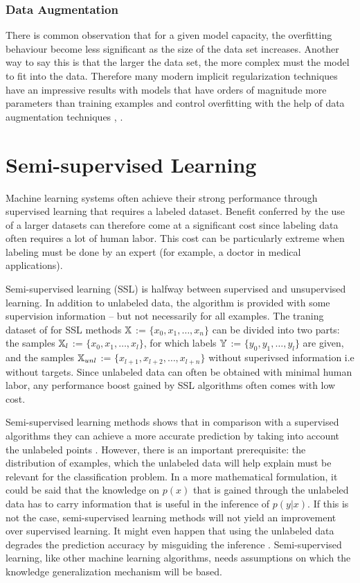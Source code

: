 \documentclass[12pt]{article}
\theoremstyle{definition}
\DeclareRobustCommand{\[}{\begin{equation}}
\DeclareRobustCommand{\]}{\end{equation}}
\begin{document}
        \subsubsection{Data Augmentation}
            There is common observation that for a given model capacity,
            the overfitting behaviour become less significant as the size of the data set increases.
            Another way to say this is that the larger the data set, the more complex must the model to fit into the data.
            Therefore many modern implicit regularization techniques have an impressive results with models that have orders of magnitude more parameters than training examples and control overfitting with the help of data augmentation techniques \cite{DataAugmentation} \cite{RandAugment}, \cite{Cutout}.
            
\section{Semi-supervised Learning}
Machine learning systems often achieve their strong performance through supervised learning that requires a labeled dataset. 
Benefit conferred by the use of a larger datasets can therefore come at a significant cost since labeling data often requires
a lot of human labor. This cost can be particularly extreme when labeling must be done by an expert (for example, a doctor in medical applications).

Semi-supervised learning (SSL) is halfway between supervised and unsupervised
learning. In addition to unlabeled data, the algorithm is provided with some supervision
information – but not necessarily for all examples. The traning dataset of 
for SSL methods $\displaystyle {\mathbb{X}}$ := $\displaystyle \{x_0, x_1, \dots, x_n \}$  can be divided into two parts: the samples $\displaystyle {\mathbb{X}}_l$ := $\displaystyle \{x_0, x_1, \dots, x_l \}$, for
which labels $\displaystyle {\mathbb{Y}}$ := $\displaystyle \{y_0, y_1, \dots, y_l \}$ are given, and the samples $\displaystyle {\mathbb{X}}_{unl}$ := $\displaystyle \{x_{l+1}, x_{l+2}, \dots, x_{l+n}\}$
without superivsed information i.e without targets. Since unlabeled data can often be obtained with minimal human labor, any performance boost gained by SSL algorithms often comes with low cost.

Semi-supervised learning methods shows that
in comparison with a supervised algorithms they can achieve a more accurate prediction by taking into account the unlabeled
points \cite{UDA}.  However, there is an important prerequisite: the
distribution of examples, which the unlabeled data will help explain must be relevant
for the classification problem.
In a more mathematical formulation, it could be said that the knowledge on $p(x)$
that is gained through the unlabeled data has to carry information that is useful
in the inference of $p(y|x)$. If this is not the case, semi-supervised learning methods will not
yield an improvement over supervised learning. It might even happen that using
the unlabeled data degrades the prediction accuracy by misguiding the inference \cite{Semi-Supervised-Book}.
Semi-supervised learning, like other machine learning algorithms, needs assumptions on which the knowledge generalization mechanism will be based. \cite{Semi-Supervised-Book}
 
\end{document}
